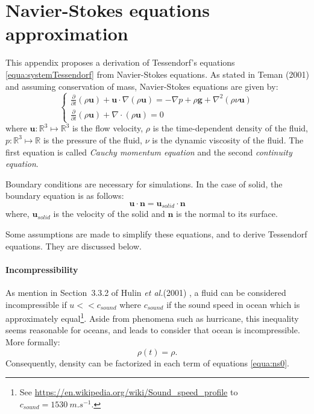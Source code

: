 \documentclass[11pt]{article}
\def\etal{\emph{et al.}\xspace}
\begin{document}
\section{Navier-Stokes equations approximation}\label{sec:annexe-NS}
This appendix proposes a derivation of Tessendorf's equations \ref{equa:systemTessendorf} from Navier-Stokes equations. As stated in Teman (2001) \cite{temamNavierStokesEquations2001} and assuming conservation of mass, Navier-Stokes equations are given by:
\begin{equation}
	\begin{cases}
		\frac{\partial}{\partial t}\left(\rho \mathbf{u}\right) + \mathbf{u} \cdot \nabla (\rho \mathbf{u}) = - \nabla p + \rho\mathbf{g} +  \nabla^2 (\rho\nu \mathbf{u}) \\
		\frac{\partial}{\partial t}\left(\rho \mathbf{u}\right) + \nabla\cdot (\rho\mathbf{u}) = 0
	\end{cases}
	\label{equa:ns0}
\end{equation}
where $\mathbf{u} :\mathbb{R}^3\mapsto \mathbb{R}^3$ is the flow velocity, $\rho$ is the time-dependent density of the fluid, $p: \mathbb{R}^3\mapsto \mathbb{R}$ is the pressure of the fluid, $\nu$ is the dynamic viscosity of the fluid.
The first equation is called \emph{Cauchy momentum equation} and the second \emph{continuity equation}.

Boundary conditions are necessary for simulations. In the case of solid, the boundary equation is as follows:
\begin{equation}
	\mathbf{u}\cdot\mathbf{n} = \mathbf{u}_{solid} \cdot \mathbf{n}
\end{equation}
where, $\mathbf{u}_{solid}$ is the velocity of the solid and $\mathbf{n}$ is the normal to its surface.

Some assumptions are made to simplify these equations, and to derive Tessendorf equations.
They are discussed below.

\paragraph{Incompressibility}
As mention in Section~3.3.2 of Hulin \etal (2001) \cite{hulinHydrodynamiquePhysique2001}, a fluid can be considered incompressible if $u<<c_{sound}$ where $c_{sound}$ if the sound speed in ocean which is approximately equal\footnote{See \url{https://en.wikipedia.org/wiki/Sound_speed_profile} to $c_{sound} = 1530~m.s^{-1}$.}.
Aside from phenomena such as hurricane, this inequality seems reasonable for oceans, and leads to consider that ocean is incompressible.
More formally:
\begin{equation}
	\rho(t)=\rho.
\end{equation}
Consequently, density can be factorized in each term of equations \ref{equa:ns0}.
\end{document}
